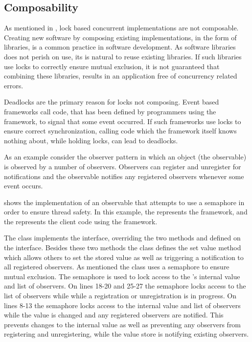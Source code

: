 
\subsection{Composability}\label{subsec:tl_composability}
As mentioned in , lock based concurrent implementations are not composable. Creating new software by composing existing implementations, in the form of libraries, is a common practice in software development. As software libraries does not perish on use, its is natural to reuse existing libraries. If such libraries use locks to correctly ensure mutual exclusion, it is not guaranteed that combining these libraries, results in an application free of concurrency related errors.

Deadlocks are the primary reason for locks not composing\cite[p. 58]{sutter2005software}. Event based frameworks call code, that has been defined by programmers using the framework, to signal that some event occurred. If such frameworks use locks to ensure correct synchronization, calling code which the framework itself knows nothing about, while holding locks, can lead to deadlocks.

As an example consider the observer pattern\cite{gamma1994design} in which an object (the observable) is observed by a number of observers. Observers can register and unregister for notifications and the observable notifies any registered observers whenever some event occurs. 

 shows the implementation of an observable that attempts to use a semaphore in order to ensure thread safety. In this example, the  represents the framework, and the  represents the client code using the framework. 

The  class implements the  interface, overriding the two methods  and  defined on the interface. Besides these two methods the   class defines the set value method which allows others to set the stored value as well as triggering a notification to all registered observers. As mentioned the  class uses a semaphore to ensure mutual exclusion. The semaphore is used to lock access to the 's internal value and list of observers. On lines 18-20 and 25-27 the semaphore locks access to the list of observers while while a registration or unregistration is in progress. On lines 8-13 the semaphore locks access to the internal value and list of observers while the value is changed and any registered observers are notified. This prevents changes to the internal value as well as preventing any observers from registering and unregistering, while the value store is notifying existing observers.

